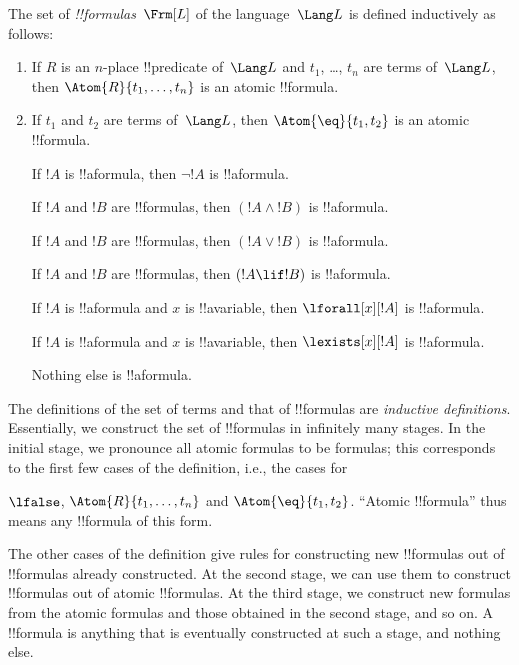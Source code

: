 \begin{defn}[Formulas]
The set of \emph{!!{formula}s}~$\Frm[L]$ of the language~$\Lang L$
is defined inductively as follows:
\begin{enumerate}
$\lfalse$ is an atomic !!{formula}.



\item If $R$ is an $n$-place !!{predicate} of~$\Lang L$ and $t_1$, \dots,
  $t_n$ are terms of~$\Lang L$, then $\Atom{R}{t_1,\ldots, t_n}$ is an
  atomic !!{formula}.

\item If $t_1$ and $t_2$ are terms of~$\Lang L$, then $\Atom{\eq}{t_1, t_2}$
  is an atomic !!{formula}.

If $!A$ is !!a{formula}, then $\lnot !A$ is
  !!a{formula}.

If $!A$ and $!B$ are !!{formula}s, then $(!A \land
  !B)$ is !!a{formula}.

If $!A$ and $!B$ are !!{formula}s, then $(!A \lor !B)$
  is !!a{formula}.

If $!A$ and $!B$ are !!{formula}s, then $(!A \lif !B)$
  is !!a{formula}.



If $!A$ is !!a{formula} and $x$ is !!a{variable},
  then $\lforall[x][!A]$ is !!a{formula}.

If $!A$ is !!a{formula} and $x$ is !!a{variable},
  then $\lexists[x][!A]$ is !!a{formula}.

Nothing else is !!a{formula}.
\end{enumerate}
\end{defn}

\begin{explain}
The definitions of the set of terms and that of !!{formula}s are
\emph{inductive definitions}.  Essentially, we construct the set of
!!{formula}s in infinitely many stages.  In the initial stage, we
pronounce all atomic formulas to be formulas; this corresponds to the
first few cases of the definition, i.e., the cases for

$\lfalse$, 
$\Atom{R}{t_1,\dots,t_n}$ and $\Atom{\eq}{t_1,t_2}$. ``Atomic
!!{formula}'' thus means any !!{formula} of this form.

The other cases of the definition give rules for constructing new
!!{formula}s out of !!{formula}s already constructed.  At the second
stage, we can use them to construct !!{formula}s out of atomic
!!{formula}s.  At the third stage, we construct new formulas from the
atomic formulas and those obtained in the second stage, and so on.  A
!!{formula} is anything that is eventually constructed at such a
stage, and nothing else.
\end{explain}

